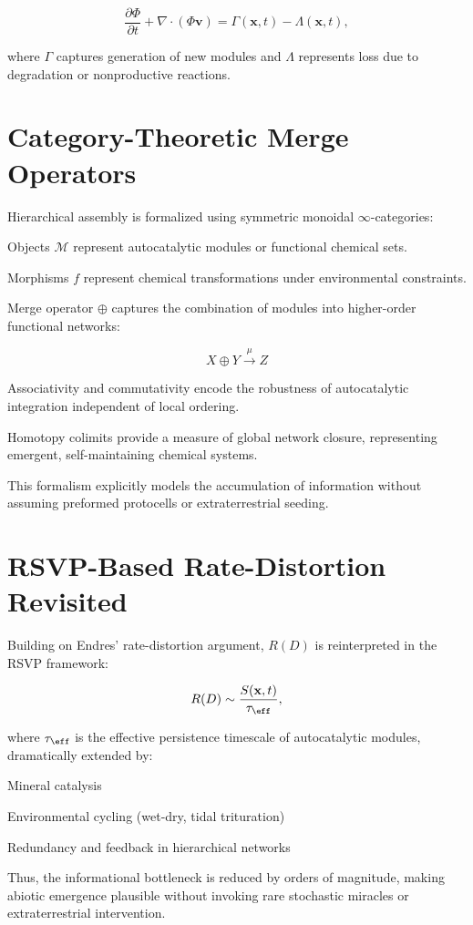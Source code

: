 \documentclass{book}
\begin{document}
\[\frac{\partial \Phi}{\partial t} + \nabla \cdot (\Phi \mathbf{v}) = \Gamma(\mathbf{x}, t) - \Lambda(\mathbf{x}, t),\]

where $\Gamma$ captures generation of new modules and $\Lambda$ represents loss due to degradation or nonproductive reactions.

\section{Category-Theoretic Merge Operators}
Hierarchical assembly is formalized using symmetric monoidal $\infty$-categories:

Objects $\mathcal{M}$ represent autocatalytic modules or functional chemical sets.

Morphisms $f$ represent chemical transformations under environmental constraints.

Merge operator $\oplus$ captures the combination of modules into higher-order functional networks:

\[X \oplus Y \xrightarrow{\mu} Z\]

Associativity and commutativity encode the robustness of autocatalytic integration independent of local ordering.

Homotopy colimits provide a measure of global network closure, representing emergent, self-maintaining chemical systems.

This formalism explicitly models the accumulation of information without assuming preformed protocells or extraterrestrial seeding.

\section{RSVP-Based Rate-Distortion Revisited}
Building on Endres’ rate-distortion argument, $R(D)$ is reinterpreted in the RSVP framework:

\[R(D) \sim \frac{S(\mathbf{x}, t)}{\tau_{\eff}},\]

where $\tau_{\eff}$ is the effective persistence timescale of autocatalytic modules, dramatically extended by:

Mineral catalysis \citep{hazen2005}

Environmental cycling (wet-dry, tidal trituration)

Redundancy and feedback in hierarchical networks

Thus, the informational bottleneck is reduced by orders of magnitude, making abiotic emergence plausible without invoking rare stochastic miracles or extraterrestrial intervention.
\end{document}
